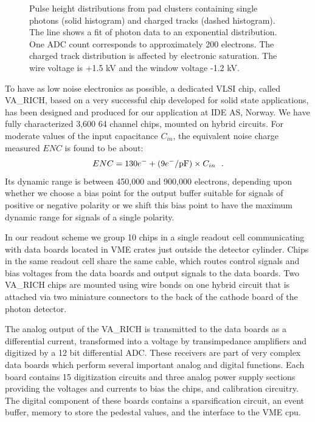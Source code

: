 \documentclass[fleqn,twoside]{article}
\begin{document}
\begin{figure} [htb]
\vspace{-.01cm} \centerline{\epsfxsize 2.5in
} \vspace{-.7cm}
\caption{\label{charge_distribution} Pulse height distributions
from pad clusters containing single photons (solid histogram) and
charged tracks (dashed histogram). The line shows a fit of photon
data to an exponential distribution. One ADC count corresponds to
approximately 200 electrons. The charged track distribution is
affected by electronic saturation. The wire voltage is +1.5 kV and the window voltage -1.2 kV.}
\vspace{-0.7cm}
\end{figure}

To have as low noise electronics as possible, a dedicated VLSI
chip, called VA\_RICH, based on a very successful chip developed
for solid state applications, has been designed and produced for
our application at IDE AS, Norway. We have fully characterized
3,600 64 channel chips, mounted on hybrid circuits. For moderate
values of the input capacitance $C_{in}$, the equivalent noise
charge measured $ENC$ is found to be about:
\begin{equation} ENC = 130 e^- + (9 e^-{\rm /pF}) \times C_{in}~~. \end{equation}
Its dynamic range is between 450,000 and 900,000 electrons, depending upon
whether we choose a bias point for the output buffer suitable for signals of
positive or negative polarity or we shift this bias point to have the maximum
dynamic range for signals of a single polarity.

In our readout scheme we group 10 chips in a single readout cell communicating
with data boards  located in VME crates just outside the detector
cylinder. Chips in the same readout cell share the same cable, which routes
control signals and bias voltages
 from the data boards and output signals to the data boards.
  Two VA\_RICH chips are mounted using wire bonds on one hybrid circuit that
is  attached via two miniature connectors to  the back of the cathode board
of the photon detector.

The analog output of the VA\_RICH is transmitted to the data boards as a
differential current, transformed  into a voltage by transimpedance amplifiers
and digitized by a 12 bit differential ADC. These receivers are  part of  very
complex data boards which perform several important analog and digital functions.
Each board  contains 15 digitization circuits and three analog power supply
sections providing the voltages and currents to  bias the chips, and
calibration circuitry. The digital component of these boards contains a
sparsification  circuit, an event buffer, memory to store the pedestal values,
and the interface to the VME cpu.
\end{document}
